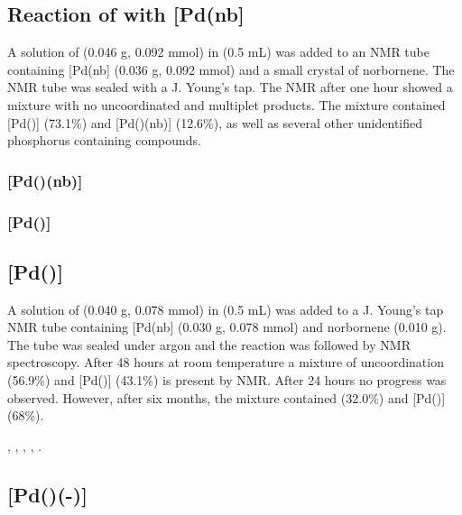 \subsection*{Reaction of \tBuxantphos{} with [Pd(nb]}

A solution of \tBuxantphos{} (0.046 g, 0.092 mmol) in  (0.5 mL) was added to an NMR tube containing [Pd(nb] (0.036 g, 0.092 mmol) and a small crystal of norbornene.  The NMR tube was sealed with a J. Young's tap.  The NMR after one hour showed a mixture with no uncoordinated \tBuxantphos{} and multiplet products.  The mixture contained [Pd(\tBuxantphos)] (73.1\%) and [Pd(\tBuxantphos)(nb)] (12.6\%), as well as several other unidentified phosphorus containing compounds.  

\subsubsection*{[Pd(\tBuxantphos)(nb)]}


\subsubsection*{[Pd(\tBuxantphos)]}


\subsection*{[Pd(\tBusixantphos)]}

A solution of \tBusixantphos{} (0.040 g, 0.078 mmol) in  (0.5 mL) was added to a J. Young's tap NMR tube containing [Pd(nb] (0.030 g, 0.078 mmol) and norbornene (0.010 g).  The tube was sealed under argon and the reaction was followed by NMR spectroscopy.  After 48 hours at room temperature a mixture of uncoordination \tBusixantphos{} (56.9\%) and [Pd(\tBusixantphos)] (43.1\%) is present by \phosphorus{} NMR.  After 24 hours no progress was observed.  However, after six months, the mixture contained \tBusixantphos{} (32.0\%) and [Pd(\tBusixantphos)] (68\%).  

,
,
,
,
.

\subsection*{[Pd(\tButhixantphos)(-)]}

